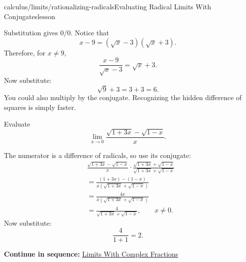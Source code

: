 \documentclass[11pt,openany]{book}
\theoremstyle{bgplain}
\newcounter{bgexample}[chapter]
\newcommand{\webnext}[2]{%
  \par\addvspace{1.2em}\noindent{\color{BGLine}\rule{\textwidth}{0.35pt}}\par\smallskip
  {\small\color{BGGray}\textbf{Continue in sequence:} \hyperlink{web:#1}{#2}}\par
}
\begin{document}
\begin{webpage}{calculus/limits/rationalizing-radicals}{Evaluating Radical Limits With Conjugates}{lesson}
\begin{bgexample}[title={Radical in the denominator}]
\begin{bgsolution}
Substitution gives \(0/0\). Notice that
\[
  x-9=(\sqrt{x}-3)(\sqrt{x}+3).
\]
Therefore, for \(x\ne9\),
\[
  \frac{x-9}{\sqrt{x}-3}=\sqrt{x}+3.
\]
Now substitute:
\[
  \sqrt9+3=3+3=\boxed{6}.
\]
You could also multiply by the conjugate. Recognizing the hidden difference of squares is simply faster.
\end{bgsolution}
\end{bgexample}

\begin{bgexample}[title={Exam-level: two radical terms}]
Evaluate
\[
  \lim_{x\to0}\frac{\sqrt{1+3x}-\sqrt{1-x}}{x}.
\]

\begin{bgsolution}
The numerator is a difference of radicals, so use its conjugate:
\begin{align*}
&\frac{\sqrt{1+3x}-\sqrt{1-x}}{x}
\cdot
\frac{\sqrt{1+3x}+\sqrt{1-x}}{\sqrt{1+3x}+\sqrt{1-x}}\\
&=\frac{(1+3x)-(1-x)}{x\left(\sqrt{1+3x}+\sqrt{1-x}\right)}\\
&=\frac{4x}{x\left(\sqrt{1+3x}+\sqrt{1-x}\right)}\\
&=\frac4{\sqrt{1+3x}+\sqrt{1-x}},\qquad x\ne0.
\end{align*}
Now substitute:
\[
  \frac4{1+1}=\boxed{2}.
\]
\end{bgsolution}
\end{bgexample}
\webnext{calculus/limits/complex-fractions}{Limits With Complex Fractions}
\end{webpage}
\end{document}
